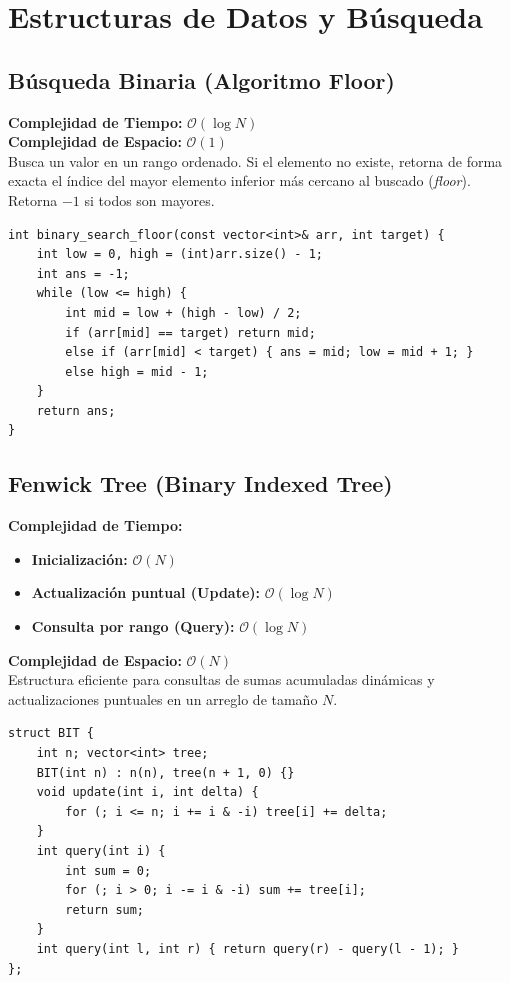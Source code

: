 \documentclass[10pt,twocolumn,letterpaper]{report}
\begin{document}
\chapter{Estructuras de Datos y Búsqueda}
\section{Búsqueda Binaria (Algoritmo Floor)}
\textbf{Complejidad de Tiempo:} $\mathcal{O}(\log N)$ \\
\textbf{Complejidad de Espacio:} $\mathcal{O}(1)$ \\
Busca un valor en un rango ordenado. Si el elemento no existe, retorna de forma exacta el índice del mayor elemento inferior más cercano al buscado (\textit{floor}). Retorna $-1$ si todos son mayores.
\begin{lstlisting}
int binary_search_floor(const vector<int>& arr, int target) {
    int low = 0, high = (int)arr.size() - 1;
    int ans = -1;
    while (low <= high) {
        int mid = low + (high - low) / 2;
        if (arr[mid] == target) return mid; 
        else if (arr[mid] < target) { ans = mid; low = mid + 1; }
        else high = mid - 1; 
    }
    return ans;
}
\end{lstlisting}
\section{Fenwick Tree (Binary Indexed Tree)}
\textbf{Complejidad de Tiempo:}
\begin{itemize}
    \item \textbf{Inicialización:} $\mathcal{O}(N)$
    \item \textbf{Actualización puntual (Update):} $\mathcal{O}(\log N)$
    \item \textbf{Consulta por rango (Query):} $\mathcal{O}(\log N)$
\end{itemize}
\textbf{Complejidad de Espacio:} $\mathcal{O}(N)$ \\
Estructura eficiente para consultas de sumas acumuladas dinámicas y actualizaciones puntuales en un arreglo de tamaño $N$.
\begin{lstlisting}
struct BIT {
    int n; vector<int> tree;
    BIT(int n) : n(n), tree(n + 1, 0) {}
    void update(int i, int delta) {
        for (; i <= n; i += i & -i) tree[i] += delta;
    }
    int query(int i) {
        int sum = 0;
        for (; i > 0; i -= i & -i) sum += tree[i];
        return sum;
    }
    int query(int l, int r) { return query(r) - query(l - 1); }
};
\end{lstlisting}
\end{document}
